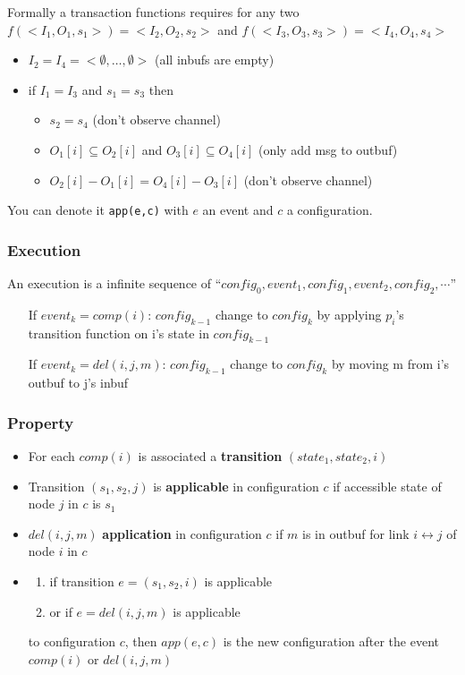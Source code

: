 Formally a transaction functions requires for any two
$f(<I_1,O_1,s_1>)=<I_2,O_2,s_2>$ and $f(<I_3,O_3,s_3>)=<I_4,O_4,s_4>$
\begin{itemize}
	\item $I_2=I_4 =<\emptyset,\ldots,\emptyset>$ (all inbufs are empty)
	\item if $I_1=I_3$ and $s_1=s_3$ then
	\begin{itemize}
		\item $s_2=s_4$ (don't observe channel)
		\item $O_1[i] \subseteq O_2[i]$ and $O_3[i] \subseteq O_4[i]$
		(only add msg to outbuf)
		\item $O_2[i]-O_1[i] = O_4[i]-O_3[i]$ (don't observe channel)
	\end{itemize}
\end{itemize}

You can denote it \verb#app(e,c)# with $e$ an event and $c$ a configuration.

\subsubsection{Execution}
An execution is a infinite sequence of \enquote{$config_0, event_1, config_1,
event_2, config_2,\cdots$}


\begin{itemize}
    \item[If] $event_k = comp(i)$: $config_{k-1}$ change to $config_k$
        by applying $p_i$'s transition function on i's state in
        $config_{k-1}$
    \item[If] $event_k = del(i, j, m)$: $config_{k-1}$ change to $config_k$
        by moving m from i's outbuf to j's inbuf
\end{itemize}


\subsubsection{Property}

\begin{itemize}
    \item For each $comp(i)$ is associated a \textbf{transition} $(state_1, state_2, i)$
    \item Transition $(s_1, s_2, j)$ is \textbf{applicable} in
        configuration $c$ if accessible state of node $j$ in $c$ is $s_1$
    \item $del(i, j, m)$ \textbf{application} in configuration $c$ if $m$ is
        in outbuf for link $i \leftrightarrow j$ of node $i$ in $c$


    \item \begin{enumerate}
            \item if transition $e=(s_1, s_2, i)$ is applicable
            \item or if $e=del(i, j, m)$ is applicable
        \end{enumerate}
        to configuration $c$, then $app(e,c)$ is the new configuration after
        the event $comp(i)$ or $del(i,j,m)$

\end{itemize}


